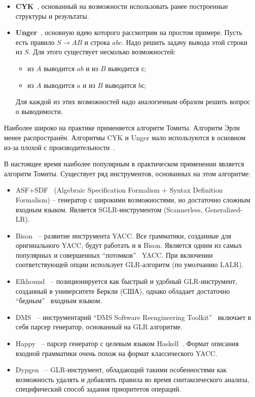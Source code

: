 \begin{itemize}
  \item {\bfseries CYK}~\cite{Practical Guide}, основанный на возможности использовать ранее построенные структуры и результаты.
  \item {\bfseries Unger}~\cite{Practical Guide}, основную идею которого рассмотрим на простом примере. Пусть есть правило $S \rightarrow AB $ и строка $abc$. Надо решить задачу вывода этой строки из $S$. Для этого существует несколько возможностей: 
\begin{itemize}
  	\item из $A$ выводится $ab$ и из $B$ выводится $с$;
  	\item из $A$ выводится $a$ и из $B$ выводится $bс$; 
  \end{itemize}
Для каждой из этих возможностей надо аналогичным образом решить вопрос о выводимости.
\end{itemize}
 
Наиболее широко на практике применяется алгоритм Томиты. Алгоритм Эрли менее распространён. Алгоритмы CYK и Unger мало используются в основном из-за плохой с производительности~\cite{Practical Guide}. 

В настоящее время наиболее популярным в практическом применении является алгоритм Томиты. Существует ряд инструментов, основанных на этом алгоритме:
\begin{itemize}
	\item
	 ASF+SDF~\cite{ASF+SDF} (Algebraic Specification Formalism + Syntax Definition Formalism) -- генератор с широкими возможностями, но достаточно сложным входным языком. Является SGLR-инструментом (Scannerless, Generalized-LR).
	
	\item
	 Bison~\cite{Bison} -- развитие инструмента YACC. Все грамматики, созданные 	для оригинального YACC, будут работать и в Bison. Является одним 	из самых популярных и совершенных "`потомков"' \ YACC. При включении 	соответствующей опции использует GLR-алгоритм (по умолчанию LALR).
	
	\item
	Elkhound~\cite{Elkhound} -- позиционируется как быстрый и удобный GLR-инструмент, созданный в университете Беркли (США), однако обладает достаточно 	"`бедным"' \ входным языком.

  \item 
  DMS~\cite{DMS} -- инструментарий "`DMS Software Reengineering Toolkit"' \ включает в себя парсер генератор, основанный на GLR алгоритме.

	\item
  Happy~\cite{Happy} -- парсер генератор с целевым языком Haskell~\cite{Haskell}. Формат описания входной грамматики очень похож на формат классического YACC.

	\item
  Dypgen~\cite{Dypgen} -- GLR-инструмент, обладающий такими особенностями как возможность удалять и добавлять правила во время синтаксического анализа, специфический способ задания приоритетов операций.

\end{itemize}

